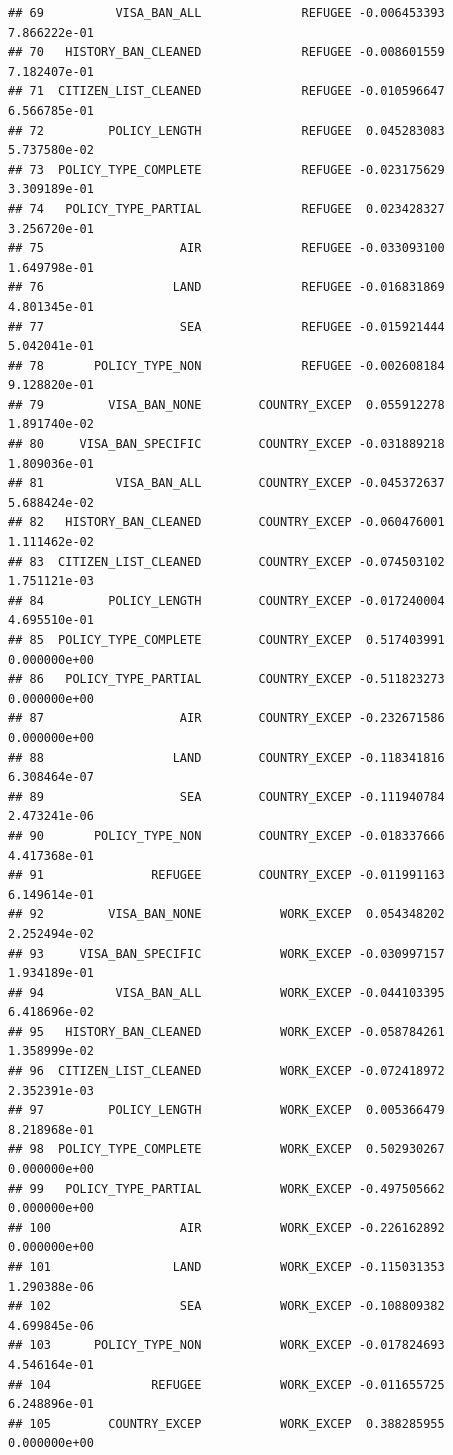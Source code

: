 \documentclass[]{article}
\begin{document}
\begin{verbatim}
## 69          VISA_BAN_ALL              REFUGEE -0.006453393 7.866222e-01
## 70   HISTORY_BAN_CLEANED              REFUGEE -0.008601559 7.182407e-01
## 71  CITIZEN_LIST_CLEANED              REFUGEE -0.010596647 6.566785e-01
## 72         POLICY_LENGTH              REFUGEE  0.045283083 5.737580e-02
## 73  POLICY_TYPE_COMPLETE              REFUGEE -0.023175629 3.309189e-01
## 74   POLICY_TYPE_PARTIAL              REFUGEE  0.023428327 3.256720e-01
## 75                   AIR              REFUGEE -0.033093100 1.649798e-01
## 76                  LAND              REFUGEE -0.016831869 4.801345e-01
## 77                   SEA              REFUGEE -0.015921444 5.042041e-01
## 78       POLICY_TYPE_NON              REFUGEE -0.002608184 9.128820e-01
## 79         VISA_BAN_NONE        COUNTRY_EXCEP  0.055912278 1.891740e-02
## 80     VISA_BAN_SPECIFIC        COUNTRY_EXCEP -0.031889218 1.809036e-01
## 81          VISA_BAN_ALL        COUNTRY_EXCEP -0.045372637 5.688424e-02
## 82   HISTORY_BAN_CLEANED        COUNTRY_EXCEP -0.060476001 1.111462e-02
## 83  CITIZEN_LIST_CLEANED        COUNTRY_EXCEP -0.074503102 1.751121e-03
## 84         POLICY_LENGTH        COUNTRY_EXCEP -0.017240004 4.695510e-01
## 85  POLICY_TYPE_COMPLETE        COUNTRY_EXCEP  0.517403991 0.000000e+00
## 86   POLICY_TYPE_PARTIAL        COUNTRY_EXCEP -0.511823273 0.000000e+00
## 87                   AIR        COUNTRY_EXCEP -0.232671586 0.000000e+00
## 88                  LAND        COUNTRY_EXCEP -0.118341816 6.308464e-07
## 89                   SEA        COUNTRY_EXCEP -0.111940784 2.473241e-06
## 90       POLICY_TYPE_NON        COUNTRY_EXCEP -0.018337666 4.417368e-01
## 91               REFUGEE        COUNTRY_EXCEP -0.011991163 6.149614e-01
## 92         VISA_BAN_NONE           WORK_EXCEP  0.054348202 2.252494e-02
## 93     VISA_BAN_SPECIFIC           WORK_EXCEP -0.030997157 1.934189e-01
## 94          VISA_BAN_ALL           WORK_EXCEP -0.044103395 6.418696e-02
## 95   HISTORY_BAN_CLEANED           WORK_EXCEP -0.058784261 1.358999e-02
## 96  CITIZEN_LIST_CLEANED           WORK_EXCEP -0.072418972 2.352391e-03
## 97         POLICY_LENGTH           WORK_EXCEP  0.005366479 8.218968e-01
## 98  POLICY_TYPE_COMPLETE           WORK_EXCEP  0.502930267 0.000000e+00
## 99   POLICY_TYPE_PARTIAL           WORK_EXCEP -0.497505662 0.000000e+00
## 100                  AIR           WORK_EXCEP -0.226162892 0.000000e+00
## 101                 LAND           WORK_EXCEP -0.115031353 1.290388e-06
## 102                  SEA           WORK_EXCEP -0.108809382 4.699845e-06
## 103      POLICY_TYPE_NON           WORK_EXCEP -0.017824693 4.546164e-01
## 104              REFUGEE           WORK_EXCEP -0.011655725 6.248896e-01
## 105        COUNTRY_EXCEP           WORK_EXCEP  0.388285955 0.000000e+00
\end{verbatim}
\end{document}
